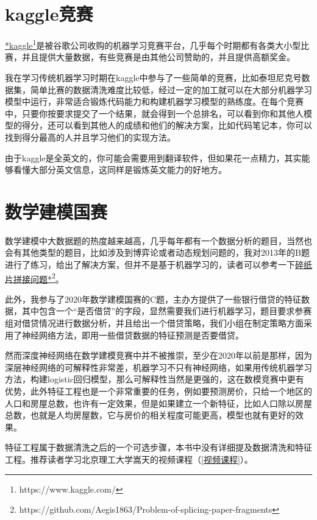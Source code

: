 \documentclass[a5paper, 11pt]{ctexbook}
\begin{document}
\section{kaggle竞赛}

\href{https://www.kaggle.com/}{*kaggle}\footnote{https://www.kaggle.com/}是被谷歌公司收购的机器学习竞赛平台，几乎每个时期都有各类大小型比赛，并且提供大量数据，有些竞赛是由其他公司赞助的，并且提供高额奖金。

我在学习传统机器学习时期在kaggle中参与了一些简单的竞赛，比如泰坦尼克号数据集，简单比赛的数据清洗难度比较低，经过一定的加工就可以在大部分机器学习模型中运行，非常适合锻炼代码能力和构建机器学习模型的熟练度。在每个竞赛中，只要你按要求提交了一个结果，就会得到一个总排名，可以看到你和其他人模型的得分，还可以看到其他人的成绩和他们的解决方案，比如代码笔记本，你可以找到得分最高的人并且学习他们的实现方法。

由于kaggle是全英文的，你可能会需要用到翻译软件，但如果花一点精力，其实能够看懂大部分英文信息，这同样是锻炼英文能力的好地方。

\section{数学建模国赛}

数学建模中大数据题的热度越来越高，几乎每年都有一个数据分析的题目，当然也会有其他类型的题目，比如涉及到博弈论或者动态规划问题的，我对2013年的B题进行了练习，给出了解决方案，但并不是基于机器学习的，读者可以参考一下\href{https://github.com/Aegis1863/Problem-of-splicing-paper-fragments}{碎纸片拼接问题*}\footnote{https://github.com/Aegis1863/Problem-of-splicing-paper-fragments}。

此外，我参与了2020年数学建模国赛的C题，主办方提供了一些银行借贷的特征数据，其中包含一个“是否借贷”的字段，显然需要我们进行机器学习，题目要求参赛组对借贷情况进行数据分析，并且给出一个借贷策略，我们小组在制定策略方面采用了神经网络方法，即用一些借贷数据的特征预测是否要借贷。

然而深度神经网络在数学建模竞赛中并不被推崇，至少在2020年以前是那样，因为深层神经网络的可解释性非常差，机器学习不只有神经网络，如果用传统机器学习方法，构建logistic回归模型，那么可解释性当然是更强的，这在数模竞赛中更有优势，此外特征工程也是一个非常重要的任务，例如要预测房价，只给一个地区的人口和房屋总数，也许有一定效果，但是如果建立一个新特征，比如人口除以房屋总数，也就是人均房屋数，它与房价的相关程度可能更高，模型也就有更好的效果。

特征工程属于数据清洗之后的一个可选步骤，本书中没有详细提及数据清洗和特征工程。推荐读者学习北京理工大学嵩天的视频课程（\ref{视频课程}）。
\end{document}
